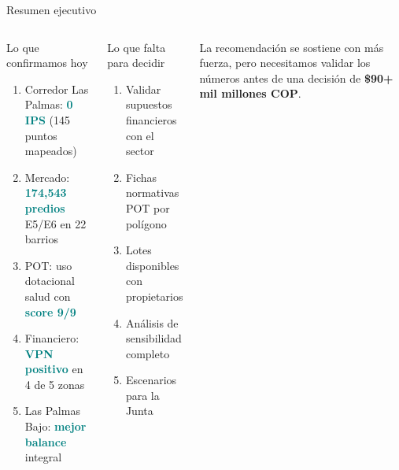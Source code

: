 \documentclass[aspectratio=169, 11pt]{beamer}
\newcommand{\highlight}[1]{\textcolor{teal}{\textbf{#1}}}
\begin{document}
\begin{frame}{Resumen ejecutivo}

\begin{columns}[T]
\begin{block}{\small Lo que confirmamos hoy}
\footnotesize
\begin{enumerate}
  \item Corredor Las Palmas: \highlight{0 IPS} (145 puntos mapeados)
  \item Mercado: \highlight{174,543 predios} E5/E6 en 22 barrios
  \item POT: uso dotacional salud con \highlight{score 9/9}
  \item Financiero: \highlight{VPN positivo} en 4 de 5 zonas
  \item Las Palmas Bajo: \highlight{mejor balance} integral
\end{enumerate}
\end{block}

\begin{alertblock}{\small Lo que falta para decidir}
\footnotesize
\begin{enumerate}
  \item Validar supuestos financieros con el sector
  \item Fichas normativas POT por polígono
  \item Lotes disponibles con propietarios
  \item Análisis de sensibilidad completo
  \item Escenarios para la Junta
\end{enumerate}
\end{alertblock}

\vspace{4pt}
{\footnotesize\textcolor{slate}{La recomendación se sostiene con más fuerza, pero necesitamos validar los números antes de una decisión de \textbf{\$90+ mil millones COP}.}}
\end{columns}
\end{frame}
\end{document}

